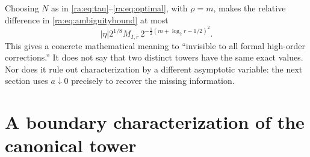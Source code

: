 \documentclass[11pt,a4paper,oneside,openany]{book}
\numberwithin{equation}{chapter}
\theoremstyle{definition}
\theoremstyle{remark}
\begin{document}
Choosing $N$ as in \eqref{ra:eq:tau}--\eqref{ra:eq:optimal}, with $\rho=m$,
makes the relative difference in \eqref{ra:eq:ambiguitybound} at most
\begin{equation}\label{ra:eq:ambiguityoptimal}
 |\eta|2^{1/8}M_{I,r}\,
       2^{-\frac12(m+\log_2r-1/2)^2}.
\end{equation}
This gives a concrete mathematical meaning to ``invisible to all formal
high-order corrections.'' It does not say that two distinct towers have
the same exact values. Nor does it rule out characterization by a different
asymptotic variable: the next section uses $a\downarrow0$ precisely to
recover the missing information.
\chapter{A boundary characterization of the canonical tower}\label{ra:sec:uniqueness}
\end{document}
